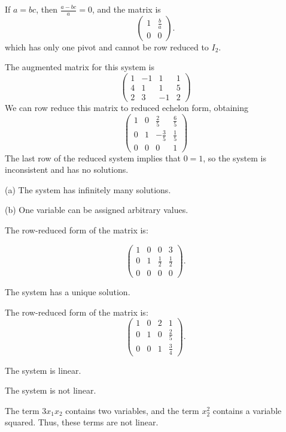 \para If $a = bc$, then $\frac{a - bc}{a} = 0$, and the matrix is
\[
\left(\begin{array}{cc} 1 & \frac{b}{a} \\ 0 & 0\end{array} \right).
\]
which has only one pivot and cannot be row reduced to $I_2$.

 The augmented matrix for this system is
\[
\left(\begin{array}{rrr|r} 1 & -1 & 1 & 1 \\ 4 & 1 & 1 & 5 \\
2 & 3 & -1 & 2\end{array}\right)
\]
We can row reduce this matrix to reduced echelon form, obtaining
\[
\left(\begin{array}{rrr|r} 1 & 0 & \frac{2}{5} & \frac{6}{5} \\
0 & 1 & -\frac{3}{5} & \frac{1}{5} \\ 0 & 0 & 0 & 1\end{array}\right)
\]
The last row of the reduced system implies that $0 = 1$, so the system
is inconsistent and has no solutions.

\ans (a) The system has infinitely many solutions.

(b) One variable can be assigned arbitrary values.

\soln The row-reduced form of the matrix is:

\[
\left(\begin{array}{rrr|r} 1 & 0 & 0 & 3 \\ 0 & 1 &
\frac{1}{2} & \frac{1}{2} \\ 0 & 0 & 0 & 0\end{array}\right).
\]

\ans The system has a unique solution.

\soln The row-reduced form of the matrix is:
\[
\left(\begin{array}{rrr|r} 1 & 0 & 2 & 1 \\ 0 & 1 & 0 & \frac{2}{5}
\\ 0 & 0 & 1 & \frac{3}{4}\end{array}\right).
\]

 \ans The system is linear.

 \ans The system is not linear.

\soln The term $3x_1x_2$ contains two variables, and the term $x_2^2$
contains a variable squared.  Thus, these terms are not linear.

